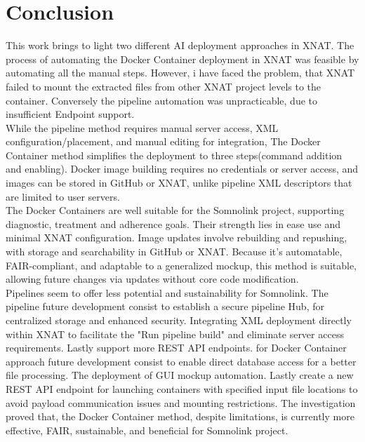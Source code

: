 \chapter{Conclusion}


This work brings to light two different AI deployment approaches in XNAT. 
The process of automating the Docker Container deployment in XNAT was feasible by automating all the manual steps. However, i have faced the problem, that XNAT failed to mount the extracted files from other XNAT project levels to the container. Conversely the pipeline automation was unpracticable, due to insufficient Endpoint support.   \\
While the pipeline method requires manual server access, XML configuration/placement, and manual editing for integration, The Docker Container method simplifies the deployment to three steps(command addition and enabling). Docker image building requires no credentials or server access, and images can be stored in GitHub or XNAT, unlike pipeline XML descriptors that are limited to user servers.\\
The Docker Containers are well suitable for the Somnolink project, supporting diagnostic, treatment and adherence goals. Their strength lies in ease use and minimal XNAT configuration. Image updates involve rebuilding and repushing, with storage and searchability in GitHub or XNAT. Because it's automatable, FAIR-compliant, and adaptable to a generalized mockup, this method is suitable, allowing future changes via updates without core code modification.\\
Pipelines seem to offer less potential and sustainability for Somnolink.
The pipeline future development consist to establish a secure pipeline Hub, for centralized storage and enhanced security. Integrating XML deployment directly within XNAT to facilitate the "Run pipeline build" and eliminate server access requirements. Lastly support more REST API endpoints.
for Docker Container approach future development consist to enable direct database access for a better file processing. The deployment of GUI mockup automation. Lastly create a new REST API endpoint for launching containers with specified input file locations to avoid payload communication issues and mounting restrictions.
The investigation proved that, the Docker Container method, despite limitations, is currently more effective, FAIR, sustainable, and beneficial for Somnolink project.



















